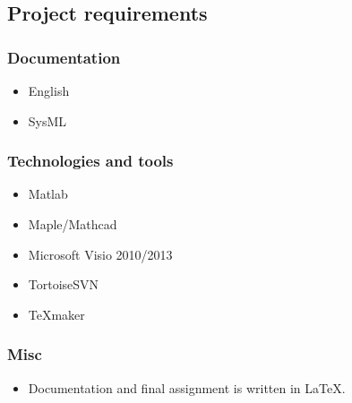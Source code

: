 \subsection{Project requirements}

\subsubsection{Documentation}
\begin{itemize}
\item English
\item SysML
\end{itemize}

\subsubsection{Technologies and tools}
\begin{itemize}
\item Matlab
\item Maple/Mathcad
\item Microsoft Visio 2010/2013
\item TortoiseSVN
\item TeXmaker
\end{itemize}

\subsubsection{Misc}
\begin{itemize}
\item Documentation and final assignment is written in LaTeX.
\end{itemize}

